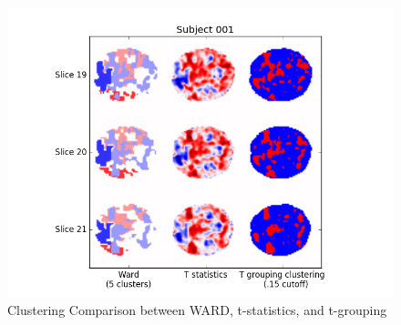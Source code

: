 \begin{figure}[ht]

	\centering
	\includegraphics[width=.8\linewidth]{../images/cluster_comparison.png} 
	\caption{Clustering Comparison between WARD, t-statistics, and t-grouping}
	\label{fig:cluster_comparison}

\end{figure}
